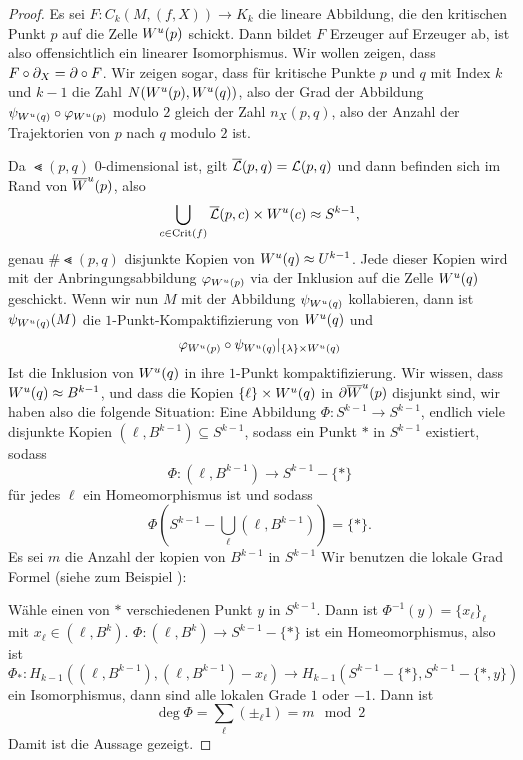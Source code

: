 \begin{proof}
    Es sei $F \colon C_k (M, (f, X)) \to K_k$ die lineare Abbildung, die den kritischen Punkt $p$
    auf die Zelle ${ W^u } (p)$ schickt. Dann bildet $F$ Erzeuger auf Erzeuger ab, ist also 
    offensichtlich ein linearer Isomorphismus. Wir wollen zeigen, dass 
    $F \circ { \partial }_X = { \partial } \circ F$. Wir zeigen sogar, dass für kritische Punkte $p$ und $q$ mit 
    Index $k$ und $k - 1$ die Zahl $N ({ W^u } (p), { W^u } (q))$, also der Grad der Abbildung 
    $\psi_{{ W^u } (q)} \circ \varphi_{{ W^u } (p)}$ modulo $2$ gleich der Zahl $n_X(p, q)$, also 
    der Anzahl der Trajektorien von $p$ nach $q$ modulo $2$ ist. 

    Da $\Lt (p, q)$ $0$-dimensional ist, gilt ${\overline{\mathcal{L}} } (p, q) = { \mathcal{L} } (p, q)$ und dann befinden sich im 
    Rand von ${ \overline{W}^u } (p)$, also 
    \[ \bigcup_{c \in { \operatorname{Crit} } (f)} {\overline{\mathcal{L}} } (p, c) \times { W^u } (c) \approx S^{k - 1} , \] 
    genau $\# \Lt (p, q)$ disjunkte Kopien von ${ W^u } (q) \approx U^{k - 1}$. Jede dieser Kopien 
    wird mit der Anbringungsabbildung $\varphi_{{ W^u } (p)}$ via der Inklusion auf die Zelle ${ W^u } (q)$
    geschickt. Wenn wir nun $M$ mit der Abbildung $\psi_{{ W^u } (q)}$ kollabieren, dann ist 
    $\psi_{{ W^u } (q)} (M)$ die $1$-Punkt-Kompaktifizierung von ${ W^u } (q)$ und 
    \[ \varphi_{{ W^u } (p)} \circ \psi_{{ W^u } (q)} |_{ \{ \lambda \} \times { W^u } (q) } \]
    Ist die Inklusion von ${ W^u } (q)$ in ihre $1$-Punkt kompaktifizierung. Wir wissen, dass 
    ${ W^u } (q) \approx B^{k - 1}$, und dass die Kopien $\{ \ell \} \times { W^u } (q)$ in 
    ${ \partial } { \overline{W}^u } (p)$ disjunkt sind, wir haben also die folgende Situation:
    Eine Abbildung $\Phi \colon S^{k - 1} \to S^{k - 1}$, endlich viele disjunkte Kopien 
    $(\ell, B^{k - 1}) \subseteq S^{k - 1}$, sodass ein Punkt $\ast$ in $S^{k - 1}$ existiert, sodass
    \[ \Phi \colon (\ell, B^{k - 1}) \to S^{k - 1} - \{ \ast \} \]
    für jedes $\ell$ ein Homeomorphismus ist und sodass
    \[ \Phi \left( S^{k - 1} - \bigcup_{\ell} \left( \ell, B^{k - 1} \right) \right) = \{ \ast \} . \]
    Es sei $m$ die Anzahl der kopien von $B^{k - 1}$ in $S^{k - 1}$
    Wir benutzen die lokale Grad Formel (siehe zum Beispiel \cite{hatcher}): 
    
    Wähle einen von $\ast$ verschiedenen Punkt $y$ in $S^{k - 1}$. Dann ist 
    $\Phi^{-1}(y) = \{ x_{\ell} \}_{\ell}$ mit $x_{\ell} \in (\ell, B^k)$. 
    $\Phi \colon (\ell, B^k) \to S^{k - 1} - \{ \ast \}$ ist ein Homeomorphismus, also ist 
    \[ \Phi_{\ast} \colon H_{k - 1} ((\ell, B^{k - 1}), (\ell, B^{k - 1}) - x_{\ell}) \to 
        H_{k - 1}(S^{k - 1} - \{ \ast \}, S^{k - 1} - \{ \ast, y \}) \]
    ein Isomorphismus, dann sind alle lokalen Grade $1$ oder $-1$. Dann ist 
    \[ \deg \Phi = \sum_{\ell} (\pm_{\ell} 1) = m \mod 2 \]
    Damit ist die Aussage gezeigt.
\end{proof}


